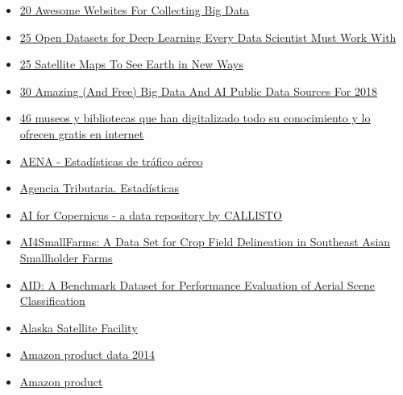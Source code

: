 \documentclass[
]{article}
\providecommand{\tightlist}{%
  \setlength{\itemsep}{0pt}\setlength{\parskip}{0pt}}
\begin{document}
\begin{itemize}
\tightlist
\item
  \href{https://datafloq.com/read/20-awesome-websites-for-collecting-big-data/2737?utm_source=Datafloq\%20newsletter&utm_campaign=979b1fada5-EMAIL_CAMPAIGN_2017_03_13&utm_medium=email&utm_term=0_655692fdfd-979b1fada5-90449429}{20
  Awesome Websites For Collecting Big Data}
\item
  \href{https://www.analyticsvidhya.com/blog/2018/03/comprehensive-collection-deep-learning-datasets/}{25
  Open Datasets for Deep Learning Every Data Scientist Must Work With}
\item
  \href{https://gisgeography.com/satellite-maps/}{25 Satellite Maps To
  See Earth in New Ways}
\item
  \href{https://www.linkedin.com/pulse/30-amazing-free-big-data-ai-public-sources-2018-bernard-marr/?trackingId=nkTXcNLieYPDBqZuB3KIsw\%3D\%3D&lipi=urn\%3Ali\%3Apage\%3Ad_flagship3_feed\%3B9KuSD9KfQ6ie\%2BALso3gwvw\%3D\%3D&licu=urn\%3Ali\%3Acontrol\%3Ad_flagship3_feed-object}{30
  Amazing (And Free) Big Data And AI Public Data Sources For 2018}
\item
  \href{http://www.xataka.com/otros/46-museos-y-bibliotecas-que-han-digitalizado-todo-su-conocimiento-humano}{46
  museos y bibliotecas que han digitalizado todo su conocimiento y lo
  ofrecen gratis en internet}
\item
  \href{https://www.aena.es/es/estadisticas/inicio.html}{AENA -
  Estadísticas de tráfico aéreo}
\item
  \href{https://sede.agenciatributaria.gob.es/Sede/estadisticas.html}{Agencia
  Tributaria. Estadísticas}
\item
  \href{https://github.com/Agri-Hub/Callisto-Dataset-Collection}{AI for
  Copernicus - a data repository by CALLISTO}
\item
  \href{https://phys-techsciences.datastations.nl/dataset.xhtml?persistentId=doi:10.17026/dans-xy6-ngg6}{AI4SmallFarms:
  A Data Set for Crop Field Delineation in Southeast Asian Smallholder
  Farms}
\item
  \href{https://captain-whu.github.io/AID/}{AID: A Benchmark Dataset for
  Performance Evaluation of Aerial Scene Classification}
\item
  \href{https://asf.alaska.edu/getstarted/}{Alaska Satellite Facility}
\item
  \href{http://jmcauley.ucsd.edu/data/amazon/}{Amazon product data 2014}
\item
  \href{https://nijianmo.github.io/amazon/index.html}{Amazon product
}
\end{itemize}
\end{document}
